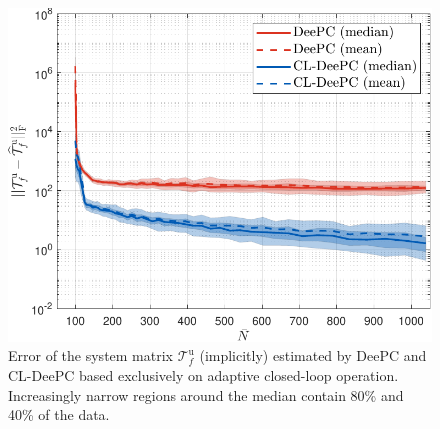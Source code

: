 \begin{figure}[b!]
\begin{center}
\includegraphics[width=\columnwidth]{results/figures/Consistency_Nbar_99-1039-50_p_20_f_20_Re_1_Ru_1_Rdu_0_Q_100_R_0_dR_10.pdf}    %
\caption{Error of the system matrix $\mathcal{T}_f^\mathrm{u}$ (implicitly) estimated by \ac{DeePC} and \ac{CL-DeePC} based exclusively on adaptive closed-loop operation. Increasingly narrow regions around the median contain 80\% and 40\% of the data.}  %
\label{fig:Tuf_consistency}                                 %
\end{center}                                 %
\end{figure}
